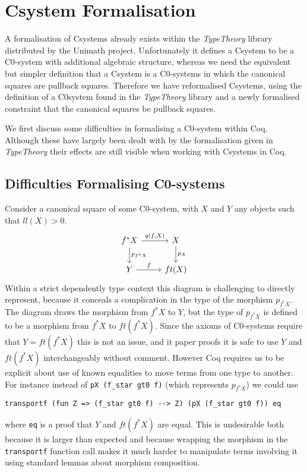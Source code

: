 \chapter{Csystem Formalisation}
A formalisation of Csystems already exists within the \textit{TypeTheory}
library distributed by the Unimath project. Unfortunately it defines a Csystem
to be a C0-system with additional algebraic structure, whereas we need the
equivalent but simpler definition that a Csystem is a C0-systems in which the
canonical squares are pullback squares. Therefore we have reformalised Csystems,
using the definition of a C0system found in the \textit{TypeTheory} library and
a newly formalised constraint that the canonical squares be pullback squares.

We first discuss some difficulties in formalising a C0-system within Coq.
Although these have largely been dealt with by the formalisation given in
\textit{TypeTheory} their effects are still visible when working with Csystems
in Coq.

\section{Difficulties Formalising C0-systems}
Consider a canonical square of some C0-system, with $X$ and $Y$ any objects such
that $ll(X) > 0$.
\[
\begin{tikzcd}
    f^*X\ar[r,"{q(f,X)}"]\ar[d,"p_{f^*X}"]&X\ar[d,"p_X"] \\
    Y\ar[r,"f"]&ft(X)
\end{tikzcd}
\]
Within a strict dependently type context this diagram is challenging to directly
represent, because it conceals a complication in the type of the morphism
$p_{f^*X}$. The diagram draws the morphism from $f^*X$ to $Y$, but the type of
$p_{f^*X}$ is defined to be a morphism from $f^*X$ to $ft(f^*X)$. Since the
axioms of C0-systems require that $Y=ft(f^*X)$ this is not an issue, and it
paper proofs it is safe to use $Y$ and $ft(f^*X)$ interchangeably without
comment. However Coq requires us to be explicit about use of known equalities to
move terms from one type to another. For instance instead of 
\verb|pX (f_star gt0 f)| (which represents $p_{f^*X}$) we could use
\begin{lstlisting}
transportf (fun Z => (f_star gt0 f) --> Z) (pX (f_star gt0 f)) eq
\end{lstlisting}
where \verb|eq| is a proof that $Y$ and $ft(f^*X)$ are equal. This is
undesirable both because it is larger than expected and because wrapping the
morphism in the \verb|transportf| function call makes it much harder to
manipulate terms involving it using standard lemmas about morphism composition.

